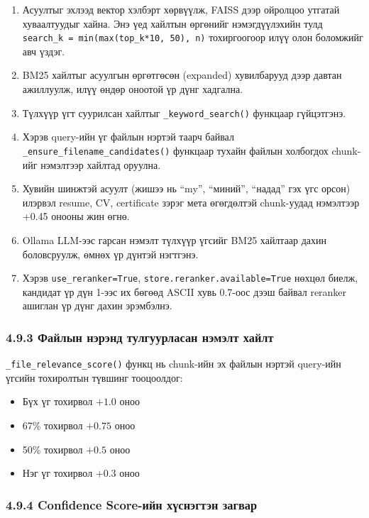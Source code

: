 \documentclass[11pt,a4paper]{article}
\begin{document}
\begin{enumerate}
\item Асуултыг эхлээд вектор хэлбэрт хөрвүүлж, FAISS дээр ойролцоо утгатай хуваалтуудыг хайна. Энэ үед хайлтын өргөнийг нэмэгдүүлэхийн тулд \texttt{search\_k = min(max(top\_k*10, 50), n)} тохиргоогоор илүү олон боломжийг авч үздэг.
\item BM25 хайлтыг асуулгын өргөтгөсөн (expanded) хувилбарууд дээр давтан ажиллуулж, илүү өндөр оноотой үр дүнг хадгална.
\item Түлхүүр үгт суурилсан хайлтыг \texttt{\_keyword\_search()} функцаар гүйцэтгэнэ.
\item Хэрэв query-ийн үг файлын нэртэй таарч байвал \texttt{\_ensure\_filename\_candidates()} функцаар тухайн файлын холбогдох chunk-ийг нэмэлтээр хайлтад оруулна.
\item Хувийн шинжтэй асуулт (жишээ нь “my”, “миний”, “надад” гэх үгс орсон) илэрвэл resume, CV, certificate зэрэг мета өгөгдөлтэй chunk-уудад нэмэлтээр +0.45 онооны жин өгнө.
\item Ollama LLM-ээс гарсан нэмэлт түлхүүр үгсийг BM25 хайлтаар дахин боловсруулж, өмнөх үр дүнтэй нэгтгэнэ.
\item Хэрэв \texttt{use\_reranker=True}, \texttt{store.reranker.available=True} нөхцөл биелж, кандидат үр дүн 1-ээс их бөгөөд ASCII хувь 0.7-оос дээш байвал reranker ашиглан үр дүнг дахин эрэмбэлнэ.
\end{enumerate}

\subsubsection*{4.9.3 Файлын нэрэнд тулгуурласан нэмэлт хайлт}

\texttt{\_file\_relevance\_score()} функц нь chunk-ийн эх файлын нэртэй query-ийн үгсийн тохиролтын түвшинг тооцоолдог:
\begin{itemize}
    \item Бүх үг тохирвол $+1.0$ оноо
    \item 67\% тохирвол $+0.75$ оноо
    \item 50\% тохирвол $+0.5$ оноо
    \item Нэг үг тохирвол $+0.3$ оноо
\end{itemize}

\subsubsection*{4.9.4 Confidence Score-ийн хүснэгтэн загвар}
\end{document}
